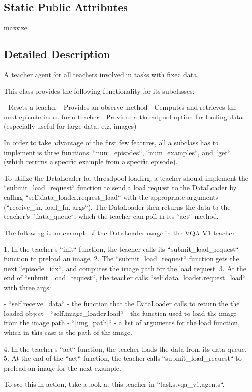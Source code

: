 \subsection*{Static Public Attributes}
\begin{DoxyCompactItemize}
\item 
\hyperlink{classparlai_1_1core_1_1teachers_1_1FixedDialogTeacher_a428d3fb5cc710cea78e9cf5a4887aa06}{maxsize}
\end{DoxyCompactItemize}


\subsection{Detailed Description}
\begin{DoxyVerb}A teacher agent for all teachers involved in tasks with fixed data.

This class provides the following functionality for its subclasses:

- Resets a teacher
- Provides an observe method
- Computes and retrieves the next episode index for a teacher
- Provides a threadpool option for loading data (especially useful for
  large data, e.g. images)

In order to take advantage of the first few features, all a subclass has to
implement is three functions: ``num_episodes``, ``num_examples``, and
``get`` (which returns a specific example from a specific episode).

To utilize the DataLoader for threadpool loading, a teacher should
implement the ``submit_load_request`` function to send a load request
to the DataLoader by calling ``self.data_loader.request_load`` with the
appropriate arguments (``receive_fn, load_fn, args``). The DataLoader then
returns the data to the teacher's ``data_queue``, which the teacher can
poll in its ``act`` method.

The following is an example of the DataLoader usage in the VQA-V1 teacher.

1. In the teacher's ``init`` function, the teacher calls its
   ``submit_load_request`` function to preload an image.
2. The ``submit_load_request`` function gets the next ``episode_idx``,
   and computes the image path for the load request.
3. At the end of ``submit_load_request``, the teacher calls
   ``self.data_loader.request_load`` with three args:

    - ``self.receive_data`` - the function that the DataLoader calls to
      return the the loaded object
    - ``self.image_loader.load`` - the function used to load the image
      from the image path
    - ``[img_path]`` - a list of arguments for the load function, which
      in this case is the path of the image.

4. In the teacher's ``act`` function, the teacher loads the data from
   its data queue.
5. At the end of the ``act`` function, the teacher calls
   ``submit_load_request`` to preload an image for the next example.

To see this in action, take a look at this teacher in ``tasks.vqa_v1.agents``.
\end{DoxyVerb}
 

